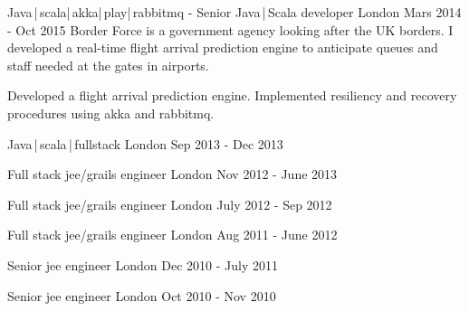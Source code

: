 \begin{cventries}
    \cventry
    {Java\,|\,scala|\,akka|\,play|\,rabbitmq}
    { - Senior Java\,|\,Scala developer}
    {London}
    {Mars 2014 - Oct 2015}
    {Border Force is a government agency looking after the UK borders. I developed a real-time flight arrival prediction engine to anticipate queues and staff needed at the gates in airports.}
    {
        \begin{cvitems}
            \item{Developed a flight arrival prediction engine. Implemented resiliency and recovery procedures using akka and rabbitmq.}
        \end{cvitems}
    }

    \cventry
    {Java\,|\,scala\,|\,fullstack}
    {} 
    {London}
    {Sep 2013 - Dec 2013}
    {}
    {}

    \cventry
    {Full stack jee/grails engineer}
    {} 
    {London}
    {Nov 2012 - June 2013}
    {}
    {}

    \cventry
    {Full stack jee/grails engineer}
    {} 
    {London}
    {July 2012 - Sep 2012}
    {}
    {}

    \cventry
    {Full stack jee/grails engineer}
    {} 
    {London}
    {Aug 2011 - June 2012}
    {}
    {}

    \cventry
    {Senior jee engineer}
    {} 
    {London}
    {Dec 2010 - July 2011}
    {}
    {}

    \cventry
    {Senior jee engineer}
    {} 
    {London}
    {Oct 2010 - Nov 2010}
    {}
    {}
\end{cventries}

